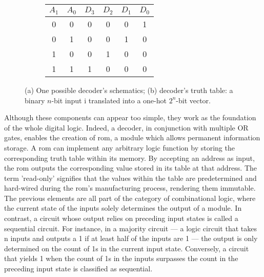 \begin{figure}[hbt!]
\begin{subfigure}{0.7\textwidth}
\begin{circuitikz}
      \end{circuitikz}
      \caption{}
    \end{subfigure}
    \hfill
    \begin{subfigure}{0.25\textwidth}
      \centering
      \begin{adjustbox}{width=1\textwidth}
        \begin{tabular}{cc|cccc}
          $A_1$ & $A_0$ & $D_3$ & $D_2$ & $D_1$ & $D_0$ \\
          \hline
          0 & 0 & 0 & 0 & 0 & 1 \\
          0 & 1 & 0 & 0 & 1 & 0 \\
          1 & 0 & 0 & 1 & 0 & 0 \\
          1 & 1 & 1 & 0 & 0 & 0 \\
          \end{tabular}
    \end{adjustbox}
      \caption{}
    \end{subfigure}
    \caption[Decoder]{(a) One possible decoder's schematics; (b) decoder's truth table:
    a binary \(n\)-bit input i translated into a one-hot \(2^n\)-bit vector.}
\label{fig:decoder}
\end{figure}

Although these components can appear too simple, they work as the foundation of the whole digital logic. Indeed, a decoder, in conjunction with multiple OR gates, enables the creation of \acrfull{rom}, a module which allows permanent information storage. A \acrshort{rom} can implement any arbitrary logic function by storing the corresponding truth table within its memory. By accepting an address as input, the \acrshort{rom} outputs the corresponding value stored in its table at that address. The term ’read-only’ signifies that the values within the table are predetermined and hard-wired during the \acrshort{rom}'s manufacturing process, rendering them immutable.\\

The previous elements are all part of the category of combinational logic, where the current state of the inputs solely determines the output of a module. In contrast, a circuit whose output relies on preceding input states is called a sequential circuit. For instance, in a majority circuit — a logic circuit that takes n inputs and outputs a 1 if at least half of the inputs are 1 — the output is only determined on the count of 1s in the current input state. Conversely, a circuit that yields 1 when the count of 1s in the inputs surpasses the count in the preceding input state is classified as sequential.\\

